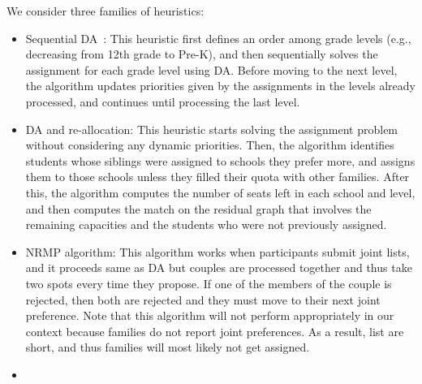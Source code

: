         We consider three families of heuristics:
        \begin{itemize}
          \item Sequential DA~\citep{Correa_2022}: This heuristic first defines an order among grade levels (e.g., decreasing from 12th grade to Pre-K), and then sequentially solves the assignment for each grade level using DA. Before moving to the next level, the algorithm updates priorities given by the assignments in the levels already processed, and continues until processing the last level.
          \item DA and re-allocation: This heuristic starts solving the assignment problem without considering any dynamic priorities. Then, the algorithm identifies students whose siblings were assigned to schools they prefer more, and assigns them to those schools unless they filled their quota with other families. After this, the algorithm computes the number of seats left in each school and level, and then computes the match on the residual graph that involves the remaining capacities and the students who were not previously assigned.
          \item NRMP algorithm: This algorithm works when participants submit joint lists, and it proceeds same as DA but couples are processed together and thus take two spots every time they propose. If one of the members of the couple is rejected, then both are rejected and they must move to their next joint preference. Note that this algorithm will not perform appropriately in our context because families do not report joint preferences. As a result, list are short, and thus families will most likely not get assigned.
          \item
        \end{itemize}
